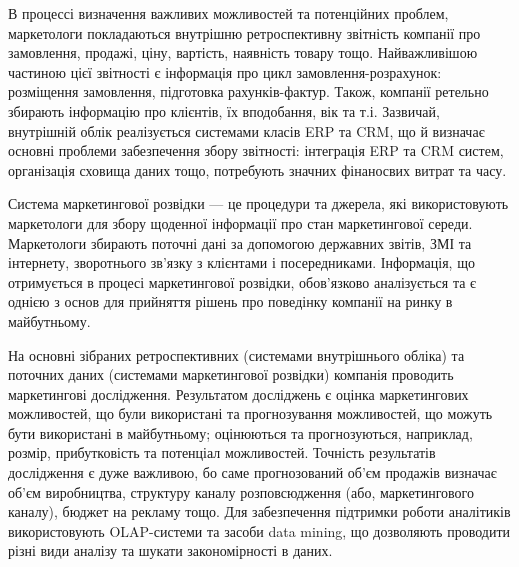 В процессі визначення важливих можливостей та потенційних проблем, маркетологи покладаються внутрішню ретроспективну звітність компанії про замовлення, продажі, ціну, вартість, наявність товару тощо. Найважливішою частиною цієї звітності є інформація про цикл замовлення-розрахунок: розміщення замовлення, підготовка рахунків-фактур. Також, компанії ретельно збирають інформацію про клієнтів, їх вподобання, вік та т.і. Зазвичай, внутрішній облік реалізується системами класів ERP та CRM, що й визначає основні проблеми забезпечення збору звітності: інтеграція ERP та CRM систем, організація сховища даних тощо, потребують значних фінаносвих витрат та часу.

Система маркетингової розвідки --- це процедури та джерела, які використовують маркетологи для збору щоденної інформації про стан маркетингової середи\cite{kotler14}. Маркетологи збирають поточні дані за допомогою державних звітів, ЗМІ та інтернету, зворотнього зв’язку з клієнтами і посередниками. Інформація, що отримується в процесі маркетингової розвідки, обов’язково аналізується та є однією з основ для прийняття рішень про поведінку компанії на ринку в майбутньому.

На основні зібраних ретроспективних (системами внутрішнього обліка) та поточних даних (системами маркетингової розвідки) компанія проводить маркетингові дослідження. Результатом досліджень є оцінка маркетингових можливостей, що були використані та прогнозування можливостей, що можуть бути використані в майбутньому; оцінюються та прогнозуються, наприклад, розмір, прибутковість та потенціал можливостей. Точність результатів дослідження є дуже важливою, бо саме прогнозований об’єм продажів визначає об’єм виробництва, структуру каналу розповсюдження (або, маркетингового каналу), бюджет на рекламу тощо. Для забезпечення підтримки роботи аналітиків використовують OLAP-системи та засоби data mining, що дозволяють проводити різні види аналізу та шукати закономірності в даних.

